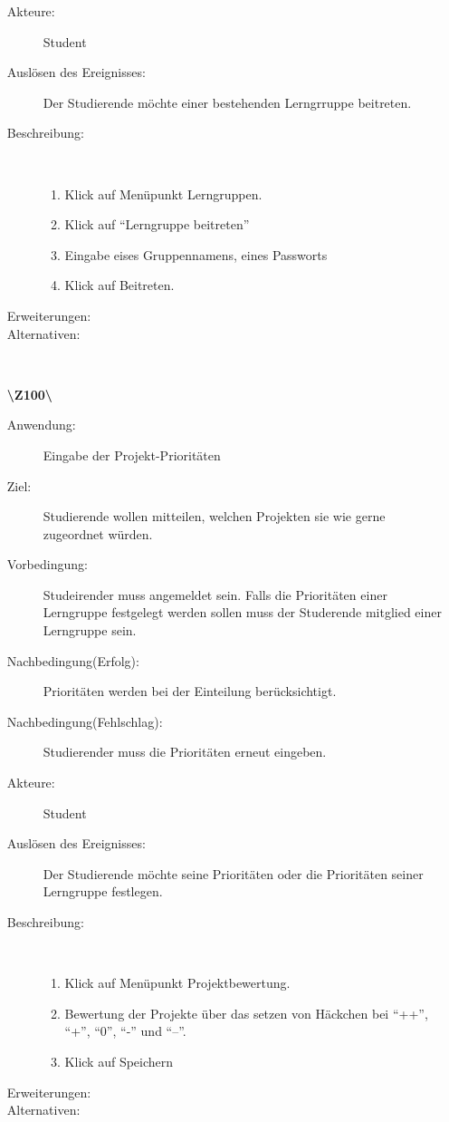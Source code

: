 \documentclass[a4paper]{article}
\begin{document}
\begin{enumerate}
\begin{description}
    \item[Akteure:] Student
    \item[Auslösen des Ereignisses:]Der Studierende möchte einer bestehenden
    Lerngrruppe beitreten.
    \item[Beschreibung:]~
    \begin{enumerate}[1.]
      \item Klick auf Menüpunkt Lerngruppen.
      \item Klick auf "`Lerngruppe beitreten"'
      \item Eingabe eises Gruppennamens, eines Passworts
      \item Klick auf Beitreten.
      
    \end{enumerate}
    \item[Erweiterungen:]
    \item[Alternativen:]~
      \end{description}
  \pagebreak
  
     \item[\textbf{\textbackslash Z100\textbackslash}] \begin{description}
    \item[Anwendung:] Eingabe der Projekt-Prioritäten
    \item[Ziel:] Studierende wollen mitteilen, welchen Projekten sie wie gerne
    zugeordnet würden.
    \item[Vorbedingung:] Studeirender muss angemeldet sein. Falls die
    Prioritäten einer Lerngruppe festgelegt werden sollen muss der Studerende
    mitglied einer Lerngruppe sein.
    \item[Nachbedingung(Erfolg):] Prioritäten werden bei der Einteilung
    berücksichtigt.
    \item[Nachbedingung(Fehlschlag):] Studierender muss die Prioritäten erneut
    eingeben.
    
    \item[Akteure:] Student
    \item[Auslösen des Ereignisses:]Der Studierende möchte seine Prioritäten
    oder die Prioritäten seiner Lerngruppe festlegen.
    \item[Beschreibung:]~
    \begin{enumerate}[1.]
      \item Klick auf Menüpunkt Projektbewertung.
      \item Bewertung der Projekte über das setzen von Häckchen bei "`++"',
      "`+"', "`0"', "`-"' und "`--"'.
      

\item Klick auf Speichern
      
    \end{enumerate}
    \item[Erweiterungen:]
    \item[Alternativen:]~
      \end{description}
  \pagebreak
\end{enumerate}
\end{document}
